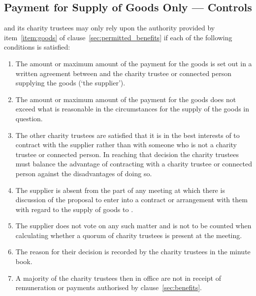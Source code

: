     \subsection{Payment for Supply of Goods Only --- Controls}\label{sec:goods_controls}
    \shortname{} and its charity trustees may only rely upon the authority provided by item~\ref{item:goods} of clause~\ref{sec:permitted_benefits} if each of the following conditions is satisfied:
    \begin{enumerate}
        \item The amount or maximum amount of the payment for the goods is set out in a written agreement between \shortname{} and the charity trustee or connected person supplying the goods (`the supplier').
        \item The amount or maximum amount of the payment for the goods does not exceed what is reasonable in the circumstances for the supply of the goods in question.
        \item The other charity trustees are satisfied that it is in the best interests of \shortname{} to contract with the supplier rather than with someone who is not a charity trustee or connected person. In reaching that decision the charity trustees must balance the advantage of contracting with a charity trustee or connected person against the disadvantages of doing so.
        \item The supplier is absent from the part of any meeting at which there is discussion of the proposal to enter into a contract or arrangement with them with regard to the supply of goods to \shortname{}.
        \item The supplier does not vote on any such matter and is not to be counted when calculating whether a quorum of charity trustees is present at the meeting.
        \item The reason for their decision is recorded by the charity trustees in the minute book.
        \item A majority of the charity trustees then in office are not in receipt of remuneration or payments authorised by clause~\ref{sec:benefits}.
    \end{enumerate}

